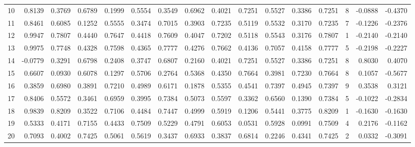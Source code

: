 \begin{tabular}{lrrrrrrrrrrrrrrr}
10  &      0.8139 &  0.3769 &  0.6789 &  0.1999 &  0.5554 &  0.3549 &  0.6962 &  0.4021 &  0.7251 &  0.5527 &   0.3386 &     0.7251 &      8 &                   -0.0888 &                    -0.4370 \\
11  &      0.8461 &  0.6085 &  0.1252 &  0.5555 &  0.3474 &  0.7015 &  0.3903 &  0.7235 &  0.5119 &  0.5532 &   0.3170 &     0.7235 &      7 &                   -0.1226 &                    -0.2376 \\
12  &      0.9947 &  0.7807 &  0.4440 &  0.7647 &  0.4418 &  0.7609 &  0.4047 &  0.7202 &  0.5118 &  0.5543 &   0.3176 &     0.7807 &      1 &                   -0.2140 &                    -0.2140 \\
13  &      0.9975 &  0.7748 &  0.4328 &  0.7598 &  0.4365 &  0.7777 &  0.4276 &  0.7662 &  0.4136 &  0.7057 &   0.4158 &     0.7777 &      5 &                   -0.2198 &                    -0.2227 \\
14  &     -0.0779 &  0.3291 &  0.6798 &  0.2408 &  0.3747 &  0.6807 &  0.2160 &  0.4021 &  0.7251 &  0.5527 &   0.3386 &     0.7251 &      8 &                    0.8030 &                     0.4070 \\
15  &      0.6607 &  0.0930 &  0.6078 &  0.1297 &  0.5706 &  0.2764 &  0.5368 &  0.4350 &  0.7664 &  0.3981 &   0.7230 &     0.7664 &      8 &                    0.1057 &                    -0.5677 \\
16  &      0.3859 &  0.6980 &  0.3891 &  0.7210 &  0.4989 &  0.6171 &  0.1878 &  0.5355 &  0.4541 &  0.7397 &   0.4945 &     0.7397 &      9 &                    0.3538 &                     0.3121 \\
17  &      0.8406 &  0.5572 &  0.3461 &  0.6959 &  0.3995 &  0.7384 &  0.5073 &  0.5597 &  0.3362 &  0.6560 &   0.1390 &     0.7384 &      5 &                   -0.1022 &                    -0.2834 \\
18  &      0.9839 &  0.8209 &  0.3522 &  0.7106 &  0.4484 &  0.7447 &  0.4999 &  0.5919 &  0.1206 &  0.5441 &   0.3775 &     0.8209 &      1 &                   -0.1630 &                    -0.1630 \\
19  &      0.5333 &  0.4171 &  0.7155 &  0.4433 &  0.7509 &  0.5229 &  0.4791 &  0.6053 &  0.0531 &  0.5928 &   0.0991 &     0.7509 &      4 &                    0.2176 &                    -0.1162 \\
20  &      0.7093 &  0.4002 &  0.7425 &  0.5061 &  0.5619 &  0.3437 &  0.6933 &  0.3837 &  0.6814 &  0.2246 &   0.4341 &     0.7425 &      2 &                    0.0332 &                    -0.3091 \\

\end{tabular}
